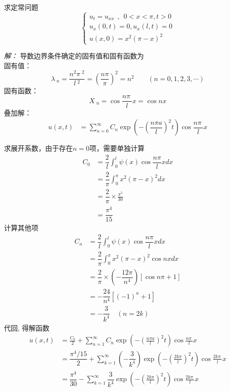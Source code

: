 \begin{example}
	求定常问题
	$$\displaystyle  \begin{cases}
		u_{t} =u_{xx} ~~,~~ 0<x<\pi, t>0\\
		u_x (0,t) =0, u_x (l,t)=0 \\
		u(x,0) =x^2 (\pi-x)^2
	\end{cases}$$ 	
\end{example}
\emph{解：}
	导数边界条件确定的固有值和固有函数为\\
	固有值：$$\displaystyle  \lambda~_n=\dfrac{n^2\pi~^2}{l~^2 }= (\dfrac{n\pi }{\pi}) ^2 = n^2 \qquad (n=0,1,2,3,\cdots)$$  
	固有函数：$$\displaystyle  X~_n=\cos \dfrac{n\pi~}{l} x=\cos nx $$
	叠加解： 
	$$
	\begin{aligned}
			u(x,t)&=  \sum\limits_{n=0}^{\infty } C_n  \exp(-(\dfrac{n\pi a}{l})^2 t) \cos \dfrac{n\pi~}{l} x\\ \\ 
		\end{aligned} 
	$$ 
	求展开系数，由于存在$n=0$项，需要单独计算
	$$
	\begin{aligned}
		C_0 &= \dfrac{2}{l} \int_{0}^{l} \psi(x) \cos \dfrac{n\pi}{l} xdx \\
		&= \dfrac{2}{\pi} \int_{0}^{\pi}  x^2 (\pi-x)^2 dx  \\
		&= \dfrac{2}{\pi}\times\frac{\pi^5}{30} \\
		&=\dfrac{\pi ^4}{15}
	\end{aligned}
	$$ 
	计算其他项
	$$
	\begin{aligned}
		C_n&=\dfrac{2}{l} \int_{0}^{l} \psi(x) \cos \dfrac{n\pi}{l} xdx \\
		&= \dfrac{2}{\pi} \int_{0}^{\pi}   x^2 (\pi-x)^2   \cos nx dx \\
		&= \dfrac{2}{\pi} \times (-\dfrac{12 \pi}{n^4})  [\cos n\pi +1 ] \\
		&= -\dfrac{24}{n^4} [ (-1)^n +1 ] \\
		&= -\dfrac{3}{k^4}\quad (n=2k)
	\end{aligned}
	$$ 
代回, 得解函数
$$\begin{aligned}
		 u(x,t)&=\frac{C_0}{2} + \sum\limits_{n=1}^{\infty } C_n \exp(-(\frac{n\pi a}{l})^2 t) \cos \frac{n\pi~}{l} x \\
         &= \dfrac{\pi ^4 /15 }{2} + \sum\limits_{k=1}^{\infty } (-\dfrac{3}{k^4}) \exp(-(\frac{2k\pi}{l})^2 t) \cos \frac{2k\pi~}{l} x \\
		 &= \dfrac{\pi ^4 }{30} - \sum\limits_{k=1}^{\infty } \dfrac{3}{k^4} \exp(-(\frac{2k\pi}{l})^2 t) \cos \frac{2k\pi~}{l} x
	\end{aligned}
	$$ 
